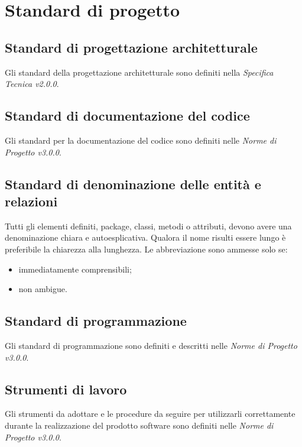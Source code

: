 \section{Standard di progetto}
\label{standard_prog}
\subsection{Standard di progettazione architetturale}
\label{progettazioneStandard}
Gli standard della progettazione architetturale sono definiti nella \emph{Specifica Tecnica v2.0.0}.

\subsection{Standard di documentazione del codice}
\label{documentazioneStandard}
Gli standard per la documentazione del codice sono definiti nelle \emph{Norme di Progetto v3.0.0}.
\subsection{Standard di denominazione delle entità e relazioni}
\label{denominazioneStandard}
Tutti gli elementi definiti, package\g{}, classi, metodi o attributi, devono avere una denominazione chiara e autoesplicativa. Qualora il nome risulti essere lungo è preferibile la chiarezza alla lunghezza.
Le abbreviazione sono ammesse solo se:
\begin{itemize}
\item immediatamente comprensibili;
\item non ambigue.
\end{itemize}

\subsection{Standard di programmazione}
\label{programmazioneStandard}

Gli standard di programmazione sono definiti e descritti nelle \emph{Norme di Progetto v3.0.0}.

\subsection{Strumenti di lavoro}
\label{strumentiLavoro}

Gli strumenti da adottare e le procedure da seguire per utilizzarli correttamente durante la realizzazione del prodotto software sono definiti nelle \emph{Norme di Progetto v3.0.0}.